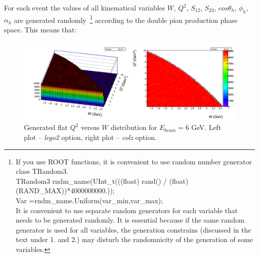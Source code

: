 For each event the values of all kinematical variables $W$, $Q^2$, $S_{12}$, $S_{23}$, $cos \theta_{h}$, $\phi_{h}$, $\alpha_{h}$ are generated randomly~\footnote[1]{If you use ROOT functions, it is convenient to use random number generator class TRandom3. \\
TRandom3 rndm\_name(UInt\_t(((float) rand() / (float)(RAND\_MAX))*4000000000.)); \\
Var =rndm\_name.Uniform(var\_min,var\_max); \\
It is convenient to use separate random generators for each variable that needs to be generated randomly. It is essential because if the same random generator is used for all variables, the generation constrains (discussed in the text under 1. and 2.) may disturb the randomnicity of the generation of some variables.} according to the double pion production phase space. This means that:

\begin{figure}[htp]
\begin{center}
\includegraphics[width=16cm]{pictures/gen_proced/flat_w_vs_q2.pdf}
\caption{\small Generated flat $Q^2$ versus $W$ distribution for $E_{beam} = 6$ GeV. Left plot -- {\it lego2} option, right plot -- {\it  colz} option.   } \label{fig:w_vs_q2_flat}
\end{center}
\end{figure}

